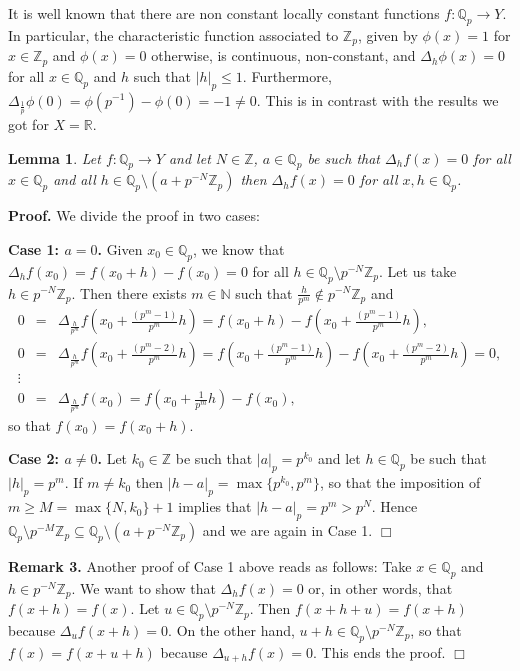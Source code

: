 \documentclass[12pt,a4paper]{amsart}
\newtheorem{lemma}[theorem]{Lemma}
\theoremstyle{definition}
\begin{document}
It is well known that there are non constant locally constant functions $f:\mathbb{Q}_p\to Y$. In particular, the characteristic function associated to $\mathbb{Z}_p$, given by $\phi(x)=1$ for $x\in \mathbb{Z}_p$ and $\phi(x)=0$ otherwise, is continuous, non-constant, and $\Delta_h\phi(x)=0$ for all $x\in\mathbb{Q}_p$ and $h$ such that $|h|_p\leq 1$. Furthermore, $\Delta_{\frac{1}{p}}\phi(0)=\phi(p^{-1})-\phi(0)=-1\neq 0$. This is in contrast with the results we got for $X=\mathbb{R}$.

\begin{lemma}\label{lemapadic} Let $f:\mathbb{Q}_p\to Y$ and let $N\in\mathbb{Z}$, $a\in\mathbb{Q}_p$ be such that $\Delta_hf(x)=0$ for all $x\in\mathbb{Q}_p$ and all $h\in \mathbb{Q}_p\setminus (a+ p^{-N}\mathbb{Z}_p)$ then $\Delta_hf(x)=0$ for all $x,h\in\mathbb{Q}_p$.
\end{lemma}

\noindent \textbf{Proof.} We divide the proof in two cases:

 \noindent \textbf{Case 1: $a=0$.}
Given $x_0\in\mathbb{Q}_p$, we know that $\Delta_hf(x_0)=f(x_0+h)-f(x_0)=0$ for all $h\in \mathbb{Q}_p\setminus p^{-N}\mathbb{Z}_p$. Let us take $h\in p^{-N}\mathbb{Z}_p$. Then there exists $m\in \mathbb{N}$ such that  $\frac{h}{p^m}\not\in p^{-N}\mathbb{Z}_p$ and
\begin{eqnarray*}
0 &= & \Delta_{\frac{h}{p^m}}f(x_0+\frac{(p^m-1)}{p^m}h) = f(x_0+h)-f(x_0+\frac{(p^m-1)}{p^m}h),\\
0 &= & \Delta_{\frac{h}{p^m}}f(x_0+\frac{(p^m-2)}{p^m}h) = f(x_0+\frac{(p^m-1)}{p^m}h)-f(x_0+\frac{(p^m-2)}{p^m}h)=0,\\
\vdots & & \\
0 &= & \Delta_{\frac{h}{p^m}}f(x_0) = f(x_0+\frac{1}{p^m}h)-f(x_0),
\end{eqnarray*}
so that $f(x_0)=f(x_0+h)$.

\noindent \textbf{Case 2: $a\neq 0$.}   Let $k_0\in\mathbb{Z}$ be such that  $|a|_p=p^{k_0}$ and let $h\in \mathbb{Q}_p$ be such that $|h|_p=p^m$. If $m\neq k_0$ then $|h-a|_p=\max\{p^{k_0},p^m\}$, so that the imposition of $m\geq M=\max\{N,k_0\}+1$ implies that $|h-a|_p=p^m >p^N$. Hence $\mathbb{Q}_p\setminus p^{-M}\mathbb{Z}_p \subseteq \mathbb{Q}_p\setminus (a+ p^{-N}\mathbb{Z}_p)$ and we are again in Case 1. {\hfill $\Box$}

\noindent \textbf{Remark 3.} Another proof of Case 1 above reads as follows: Take $x\in \mathbb{Q}_p$ and $h\in p^{-N}\mathbb{Z}_p$. We want to show that $\Delta_hf(x)=0$ or, in other words, that $f(x+h)=f(x)$. Let $u\in\mathbb{Q}_p\setminus p^{-N}\mathbb{Z}_p$. Then $f(x+h+u)=f(x+h)$  because $\Delta_uf(x+h)=0$. On the other hand, $u+h \in \mathbb{Q}_p\setminus p^{-N}\mathbb{Z}_p$, so that $f(x)=f(x+u+h)$ because $\Delta_{u+h}f(x)=0$. This ends the proof. {\hfill $\Box$}
 
\end{document}
